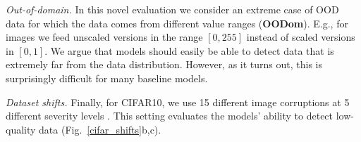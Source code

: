 \textit{Out-of-domain.} In this novel evaluation we consider an extreme case of OOD data for which the data comes from different value ranges (\textbf{OODom}). E.g., for images we feed unscaled versions in the range $[0, 255]$ instead of scaled versions in $[0,1]$. We argue that models should easily be able to detect data that is extremely far from the data distribution. However, as it turns out, this is surprisingly difficult for many baseline models.

\textit{Dataset shifts.} Finally, for CIFAR10, we use 15 different image corruptions at 5 different severity levels \cite{benchmarking_corruptions}. This setting evaluates the models' ability to detect low-quality data (Fig.~\ref{cifar_shifts}b,c).

\begin{table}
    \centering
    \caption{Results on Sensorless Drive dataset. Bold numbers indicate best score among Dirichlet parametrized models and starred numbers indicate best scores among all models.}
    \label{fig:unc_sensorless_drive}
\end{table}


